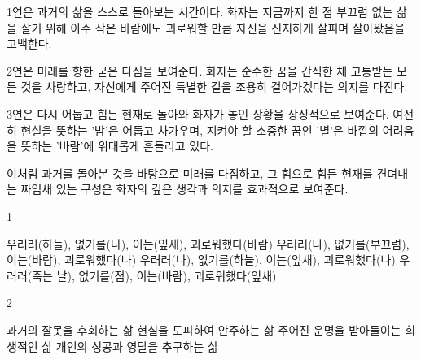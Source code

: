 \documentclass[fs9,seriesRus]{korfarm-base}
\begin{document}
{1연은 과거의 삶을 스스로 돌아보는 시간이다. 화자는 지금까지 한 점 부끄럼 없는 삶을 살기 위해 아주 작은 바람에도 괴로워할 만큼 자신을 진지하게 살피며 살아왔음을 고백한다. 

2연은 미래를 향한 굳은 다짐을 보여준다. 화자는 순수한 꿈을 간직한 채 고통받는 모든 것을 사랑하고, 자신에게 주어진 특별한 길을 조용히 걸어가겠다는 의지를 다진다. 

3연은 다시 어둡고 힘든 현재로 돌아와 화자가 놓인 상황을 상징적으로 보여준다. 여전히 현실을 뜻하는 '밤'은 어둡고 차가우며, 지켜야 할 소중한 꿈인 '별'은 바깥의 어려움을 뜻하는 '바람'에 위태롭게 흔들리고 있다.

이처럼 과거를 돌아본 것을 바탕으로 미래를 다짐하고, 그 힘으로 힘든 현재를 견뎌내는 짜임새 있는 구성은 화자의 깊은 생각과 의지를 효과적으로 보여준다.
}


\kfActivityBg \par{}
\par{}\par\nopagebreak[4]\smallskip\nopagebreak[4]
\kfBeginMC
\begin{kfSentenceUnit}{1}{}
\begin{kfChoices}
\kfChoice 우러러(하늘), 없기를(나), 이는(잎새), 괴로워했다(바람)
\kfChoice 우러러(나), 없기를(부끄럼), 이는(바람), 괴로워했다(나)
\kfChoice 우러러(나), 없기를(하늘), 이는(잎새), 괴로워했다(나)
\kfChoice 우러러(죽는 날), 없기를(점), 이는(바람), 괴로워했다(잎새)
\end{kfChoices}
\end{kfSentenceUnit}

\begin{kfSentenceUnit}{2}{}
\begin{kfChoices}
\kfChoice 과거의 잘못을 후회하는 삶
\kfChoice 현실을 도피하여 안주하는 삶
\kfChoice 주어진 운명을 받아들이는 희생적인 삶
\kfChoice 개인의 성공과 영달을 추구하는 삶
\end{kfChoices}
\end{kfSentenceUnit}

\kfEndMC
\end{document}
